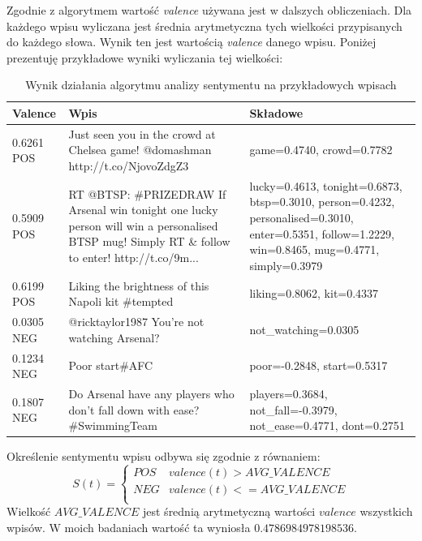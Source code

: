 Zgodnie z algorytmem wartość \textit{valence} używana jest w dalszych
obliczeniach. Dla każdego wpisu wyliczana jest średnia arytmetyczna tych
wielkości przypisanych do każdego słowa. Wynik ten jest wartością
\textit{valence} danego wpisu. Poniżej prezentuję przykładowe wyniki wyliczania
tej wielkości:
\clearpage
\begin{table}[ht!]  
\begin{center}  
\begin{tabular}{|p{12mm}|p{70mm}|>{\raggedright\arraybackslash}p{60mm}|}
\hline
Valence & Wpis & Składowe 
\\ \hline 
0.6261 POS & Just seen you in the crowd at Chelsea game! @domashman http://t.co/NjovoZdgZ3 & {game=0.4740, crowd=0.7782}
\\ \hline
0.5909 POS & RT @BTSP: \#PRIZEDRAW If Arsenal win tonight one lucky person
will win a personalised BTSP mug! Simply RT \& follow to enter!
http://t.co/9m... & {lucky=0.4613, tonight=0.6873, btsp=0.3010, person=0.4232, personalised=0.3010, enter=0.5351, follow=1.2229, win=0.8465, mug=0.4771, simply=0.3979}
\\ \hline
0.6199 POS & Liking the brightness of this Napoli kit \#tempted &
{liking=0.8062, kit=0.4337} \\ \hline
0.0305 NEG & @ricktaylor1987 You're not watching Arsenal? &
{not\_watching=0.0305} \\ \hline
0.1234 NEG & Poor start\#AFC & {poor=-0.2848, start=0.5317}
\\ \hline
0.1807 NEG & Do Arsenal have any players who don't fall down with ease?
\#SwimmingTeam & {players=0.3684, not\_fall=-0.3979, not\_ease=0.4771,
dont=0.2751} \\ \hline
\end{tabular} 
\end{center} 
\caption{Wynik działania algorytmu analizy sentymentu na przykładowych wpisach}
\end{table}

Określenie sentymentu wpisu odbywa się zgodnie z równaniem:
\begin{equation}
S(t) =
\begin{cases}
POS & valence(t) > AVG\_VALENCE \\
NEG & valence(t) <= AVG\_VALENCE \\
\end{cases}
\end{equation}
Wielkość $AVG\_VALENCE$ jest średnią arytmetyczną wartości $valence$
wszystkich wpisów. W moich badaniach wartość ta wyniosła $0.4786984978198536$.

